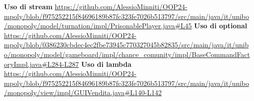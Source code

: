 \textbf{Uso di stream}\newline
\url{https://github.com/AlessioMinniti/OOP24-mpoly/blob/f975252215f84696189b87fc323fe7026b513797/src/main/java/it/unibo/monopoly/model/turnation/impl/PrisonablePlayer.java#L45}\newline
\textbf{Uso di optional}\newline
\url{https://github.com/AlessioMinniti/OOP24-mpoly/blob/0386230cbdec4ec2fbe73945c770327045b82835/src/main/java/it/unibo/monopoly/model/gameboard/impl/chance_comunity/impl/BaseCommandFactoryImpl.java#L284-L287}\newline
\textbf{Uso di lambda}\newline
\url{https://github.com/AlessioMinniti/OOP24-mpoly/blob/f975252215f84696189b87fc323fe7026b513797/src/main/java/it/unibo/monopoly/view/impl/GUIVendita.java#L140-L142}\newline
